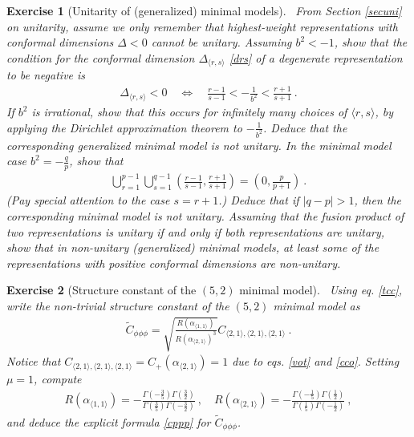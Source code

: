 \documentclass[12pt,a4paper,notitlepage]{report}
\numberwithin{equation}{section}
\theoremstyle{break}
\newtheorem{exo}{Exercise}[chapter]
\begin{document}
\begin{exo}[Unitarity of (generalized) minimal models]
 ~\label{exoneg}
From Section \ref{secuni} on unitarity, assume we only remember that highest-weight representations with conformal dimensions $\Delta <0$ cannot be unitary. 
Assuming $b^2 < -1$, show that the condition for the conformal dimension $\Delta_{\langle r,s \rangle}$ \eqref{drs} of a degenerate representation to be negative is 
\begin{align}
 \Delta_{\langle r,s \rangle} < 0 \quad \Leftrightarrow \quad \frac{r-1}{s-1} < -\frac{1}{b^2} < \frac{r+1}{s+1} \ .
\end{align}
If $b^2$ is irrational, show that this occurs for infinitely many choices of $\langle r,s \rangle$, by applying the Dirichlet approximation theorem to $-\frac{1}{b^2}$. 
Deduce that the corresponding generalized minimal model is not unitary. 
In the minimal model case $b^2 = -\frac{q}{p}$, show that 
\begin{align}
 \bigcup_{r=1}^{p-1}\bigcup_{s=1}^{q-1} \left( \frac{r-1}{s-1} , \frac{r+1}{s+1} \right)  = \left(0, \frac{p}{p+1}\right) \ .
\end{align}
(Pay special attention to the case $s=r+1$.) Deduce that if $|q-p|>1$, then the corresponding minimal model is not unitary.
Assuming that the fusion product of two representations is unitary if and only if both representations are unitary, show that in non-unitary (generalized) minimal models, at least some of the representations with positive conformal dimensions are non-unitary.
\end{exo}

\begin{exo}[Structure constant of the $(5,2)$ minimal model]
 ~\label{exocppp}
Using eq. \eqref{tcc}, write the non-trivial structure constant of the $(5,2)$ minimal model as 
\begin{align}
 \tilde{C}_{\phi\phi\phi} = \sqrt{\frac{R(\alpha_{\langle 1,1 \rangle})}{R(\alpha_{\langle 2,1 \rangle})^3}} C_{\langle 2,1\rangle , \langle 2,1 \rangle,\langle 2,1 \rangle}\ .
\end{align}
Notice that $C_{\langle 2,1\rangle , \langle 2,1 \rangle,\langle 2,1 \rangle} = C_+(\alpha_{\langle 2,1 \rangle})=1$ due to eqs. \eqref{vot} and \eqref{cco}.
Setting $\mu=1$, compute
\begin{align}
 R(\alpha_{\langle 1,1 \rangle}) = -\frac{\Gamma(-\frac35)\Gamma(\frac32)}{\Gamma(\frac35)\Gamma(-\frac32)} \ , \quad R(\alpha_{\langle 2,1 \rangle}) = -\frac{\Gamma(-\frac15)\Gamma(\frac12)}{\Gamma(\frac15)\Gamma(-\frac12)}\ , 
\end{align}
and deduce the explicit formula \eqref{cppp} for $\tilde{C}_{\phi\phi\phi}$.
\end{exo}
\end{document}
